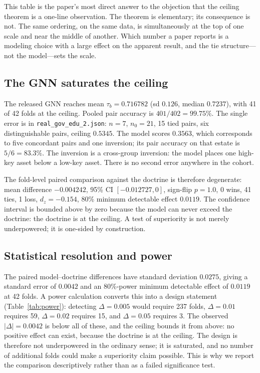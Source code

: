 \documentclass[conference,10pt]{IEEEtran}
\newcommand{\tb}{\tau_b}
\newcommand{\nzero}{n_0}
\begin{document}
This table is the paper's most direct answer to the objection that the ceiling theorem is a
one-line observation. The theorem is elementary; its consequence is not. The same ordering, on
the same data, is simultaneously at the top of one scale and near the middle of another. Which
number a paper reports is a modeling choice with a large effect on the apparent result, and the
tie structure---not the model---sets the scale.

\subsection{The GNN saturates the ceiling}
The released GNN reaches mean $\tb=0.716782$ (sd $0.126$, median $0.7237$), with 41 of 42 folds
at the ceiling. Pooled pair accuracy is $401/402=99.75\%$. The single error is in
\texttt{real\_gov\_edu\_2.json}: $n=7$, $\nzero=21$, 15 tied pairs, six distinguishable pairs,
ceiling $0.5345$. The model scores $0.3563$, which corresponds to five concordant pairs and one
inversion; its pair accuracy on that estate is $5/6=83.3\%$. The inversion is a cross-group
inversion: the model places one high-key asset below a low-key asset. There is no second error
anywhere in the cohort.

The fold-level paired comparison against the doctrine is therefore degenerate: mean difference
$-0.004242$, 95\% CI $[-0.012727,0]$, sign-flip $p=1.0$, 0 wins, 41 ties, 1 loss,
$d_z=-0.154$, 80\% minimum detectable effect $0.0119$. The confidence interval is bounded above
by zero because the model can never exceed the doctrine: the doctrine is at the ceiling. A test
of superiority is not merely underpowered; it is one-sided by construction.

\subsection{Statistical resolution and power}
\label{sec:power}

The paired model--doctrine differences have standard deviation $0.0275$, giving a standard error
of $0.0042$ and an $80\%$-power minimum detectable effect of $0.0119$ at 42 folds. A power
calculation converts this into a design statement (Table~\ref{tab:power}): detecting
$\Delta=0.005$ would require 237 folds, $\Delta=0.01$ requires 59, $\Delta=0.02$ requires 15, and
$\Delta=0.05$ requires 3. The observed $|\Delta|=0.0042$ is below all of these, and the ceiling
bounds it from above: no positive effect can exist, because the doctrine is at the ceiling. The
design is therefore not underpowered in the ordinary sense; it is saturated, and no number of
additional folds could make a superiority claim possible. This is why we report the comparison
descriptively rather than as a failed significance test.
\end{document}
